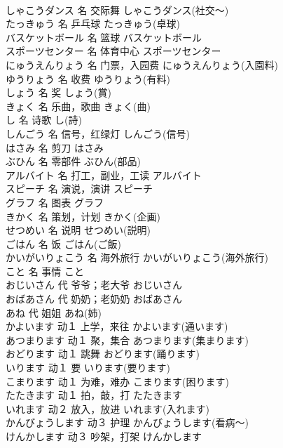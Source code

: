 \documentclass[8pt]{extreport}
\begin{document}
\begin{CJK}{UTF8}{min}
\\	しゃこうダンス	名	交际舞	しゃこうダンス(社交～)	
\\	たっきゅう	名	乒乓球	たっきゅう(卓球)	
\\	バスケットボール	名	篮球	バスケットボール	
\\	スポーツセンター	名	体育中心	スポーツセンター	
\\	にゅうえんりょう	名	门票，入园费	にゅうえんりょう(入園料)	
\\	ゆうりょう	名	收费	ゆうりょう(有料)	
\\	しょう	名	奖	しょう(賞)	
\\	きょく	名	乐曲，歌曲	きょく(曲)	
\\	し	名	诗歌	し(詩)	
\\	しんごう	名	信号，红绿灯	しんごう(信号)	
\\	はさみ	名	剪刀	はさみ	
\\	ぶひん	名	零部件	ぶひん(部品)	
\\	アルバイト	名	打工，副业，工读	アルバイト	
\\	スピーチ	名	演说，演讲	スピーチ	
\\	グラフ	名	图表	グラフ	
\\	きかく	名	策划，计划	きかく(企画)	
\\	せつめい	名	说明	せつめい(説明)	
\\	ごはん	名	饭	ごはん(ご飯)	
\\	かいがいりょこう	名	海外旅行	かいがいりょこう(海外旅行)	
\\	こと	名	事情	こと	
\\	おじいさん	代	爷爷；老大爷	おじいさん	
\\	おばあさん	代	奶奶；老奶奶	おばあさん	
\\	あね	代	姐姐	あね(姉)	
\\	かよいます	动１	上学，来往	かよいます(通います)	
\\	あつまります	动１	聚，集合	あつまります(集まります)	
\\	おどります	动１	跳舞	おどります(踊ります)	
\\	いります	动１	要	いります(要ります)	
\\	こまります	动１	为难，难办	こまります(困ります)	
\\	たたきます	动１	拍，敲，打	たたきます	
\\	いれます	动２	放入，放进	いれます(入れます)	
\\	かんびょうします	动３	护理	かんびょうします(看病～)	
\\	けんかします	动３	吵架，打架	けんかします	

\end{CJK}
\end{document}

